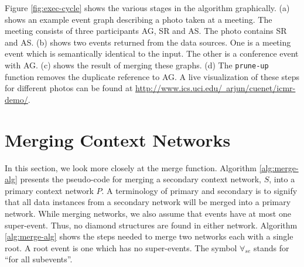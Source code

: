 Figure \ref{fig:exec-cycle} shows the various stages in the algorithm graphically. (a) shows an example event graph describing a photo taken at a meeting. The meeting consists of three participants AG, SR and AS. The photo contains SR and AS. (b) shows two events returned from the data sources. One is a meeting event which is semantically identical to the input. The other is a conference event with AG. (c) shows the result of merging these graphs. (d) The \texttt{prune-up} function removes the duplicate reference to AG. A live visualization of these steps for different photos can be found at \underline{\href{http://www.ics.uci.edu/~arjun/cuenet/icmr-demo/}{http://www.ics.uci.edu/~arjun/cuenet/icmr-demo/}}.

\section{Merging Context Networks}
In this section, we look more closely at the merge function. Algorithm \ref{alg:merge-alg} presents the pseudo-code for merging a secondary context network, $S$, into a primary context network $P$. A terminology of primary and secondary is to signify that all data instances from a secondary network will be merged into a primary network. While merging networks, we also assume that events have at most one super-event. Thus, no diamond structures are found in either network. Algorithm \ref{alg:merge-alg} shows the steps needed to merge two networks each with a single root. A root event is one which has no super-events. The symbol $\forall_{se}$ stands for ``for all subevents''.

